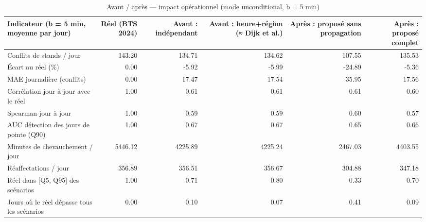 \begin{table}
\caption{Avant / après — impact opérationnel (mode unconditional, b = 5 min)}
\label{tab:T3b_unconditional}
\begin{tabular}{lrrrrr}
\toprule
Indicateur (b = 5 min, moyenne par jour) & Réel (BTS 2024) & Avant : indépendant & Avant : heure+région (≈ Dijk et al.) & Après : proposé sans propagation & Après : proposé complet \\
\midrule
Conflits de stands / jour & 143.20 & 134.71 & 134.62 & 107.55 & 135.53 \\
Écart au réel (\%) & 0.00 & -5.92 & -5.99 & -24.89 & -5.36 \\
MAE journalière (conflits) & 0.00 & 17.47 & 17.54 & 35.95 & 17.56 \\
Corrélation jour à jour avec le réel & 1.00 & 0.61 & 0.61 & 0.61 & 0.60 \\
Spearman jour à jour & 1.00 & 0.59 & 0.59 & 0.60 & 0.57 \\
AUC détection des jours de pointe (Q90) & 1.00 & 0.67 & 0.67 & 0.65 & 0.66 \\
Minutes de chevauchement / jour & 5446.12 & 4225.89 & 4225.24 & 2467.03 & 4403.55 \\
Réaffectations / jour & 356.89 & 356.51 & 356.67 & 304.88 & 347.18 \\
Réel dans [Q5, Q95] des scénarios & 1.00 & 0.71 & 0.80 & 0.33 & 0.70 \\
Jours où le réel dépasse tous les scénarios & 0.00 & 0.10 & 0.07 & 0.41 & 0.09 \\
\bottomrule
\end{tabular}
\end{table}

